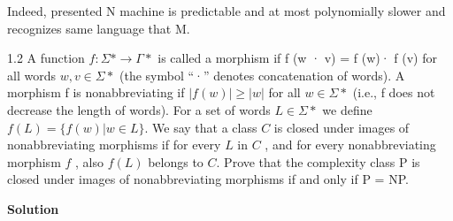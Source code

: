 \documentclass[12pt]{article}
\begin{document}
Indeed, presented N machine is predictable and at most polynomially slower and recognizes same language that M. 


1.2    A function $f\colon\Sigma\ast\to\Gamma\ast$ is called a morphism if f (w · v) = f (w)· f (v)
for all words $w, v \in \Sigma\ast$
(the symbol “·” denotes concatenation of words). A morphism f is
nonabbreviating if $|f(w)| \ge |w|$ for all $w \in \Sigma\ast$
(i.e., f does not decrease the length of words).
For a set of words $L \in \Sigma\ast$ we define $f(L) = \{f(w) | w \in L\}$. We say that a class $C$ is closed under
images of nonabbreviating morphisms if for every  $L$ in  $C$ , and for every nonabbreviating
morphism  $f$ , also  $f(L)$ belongs to  $C$.
Prove that the complexity class P is closed under images of nonabbreviating morphisms if and only if P = NP.

{\bf Solution}
\end{document}
